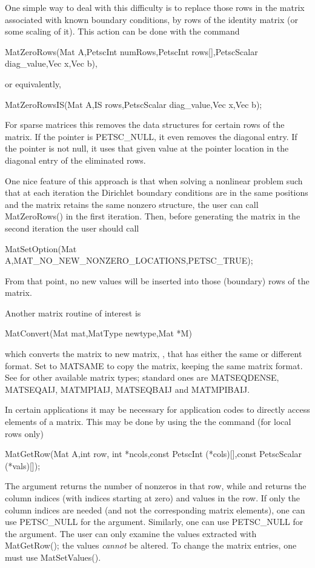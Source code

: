 One simple way to deal with this difficulty is to replace those rows in the 
matrix associated with known boundary conditions, by rows of the 
identity matrix (or some scaling of it). This action can be done with 
the command
\begin{tabbing}
  MatZeroRows(Mat A,PetscInt numRows,PetscInt rows[],PetscScalar diag\_value,Vec x,Vec b),
\end{tabbing}
or equivalently,
\begin{tabbing}
  MatZeroRowsIS(Mat A,IS rows,PetscScalar diag\_value,Vec x,Vec b);
\end{tabbing}
For sparse matrices this removes the data structures for certain rows 
of the matrix. If the pointer  is PETSC_NULL, it 
even removes the diagonal entry. If the pointer is not null, it uses that 
given value at the pointer location 
in the diagonal entry of the eliminated rows. 

One nice feature of this approach is that when solving a nonlinear problem 
such that at each iteration the Dirichlet boundary conditions are in the 
same positions and the matrix retains the same nonzero structure, the user 
can call MatZeroRows() in the first iteration. Then, before generating 
the matrix in the second iteration the user should call
\begin{tabbing}
  MatSetOption(Mat A,MAT\_NO\_NEW\_NONZERO\_LOCATIONS,PETSC_TRUE);
\end{tabbing}
From that point,
no new values will be inserted into those (boundary) rows of 
the matrix.  

Another matrix routine of interest is
\begin{tabbing}
  MatConvert(Mat mat,MatType newtype,Mat *M)
\end{tabbing}
which converts the matrix  to new matrix, , that has
either the same or different format.  Set  to MATSAME
to copy the matrix, keeping the same matrix format.  See 
 for other available matrix types;
standard ones are MATSEQDENSE, MATSEQAIJ, MATMPIAIJ, 
               MATSEQBAIJ and MATMPIBAIJ.

In certain applications it may be necessary for application codes
to directly access elements of a matrix. This may be done by using the 
the command (for local rows only)
\begin{tabbing}
  MatGetRow(Mat A,int row, int *ncols,const PetscInt (*cols)[],const PetscScalar (*vals)[]);
\end{tabbing}
The argument  returns the number of nonzeros in that row, 
while  and  returns the column indices (with indices
starting at zero) and values in the row. If only the column 
indices are needed (and not the corresponding matrix elements), one
can use PETSC_NULL for the  argument. Similarly,
one can use PETSC_NULL for the  argument.
The user can only examine the values extracted with MatGetRow();
the values {\em cannot} be altered. 
To change the matrix entries, one must use MatSetValues().

